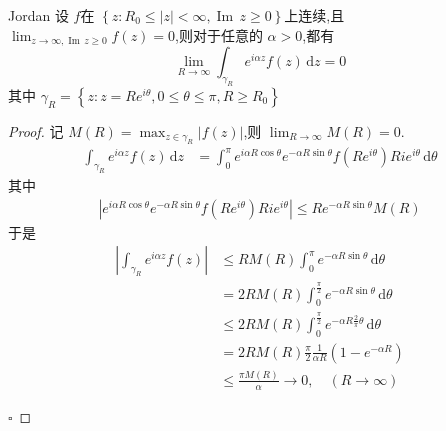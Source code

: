 \documentclass[../../复变函数.tex]{subfiles}
\begin{document}
\begin{lemma}{Jordan}
    设 \(  f  \)在 \(  \left\{ z: R_0\le \left| z \right|< \infty, \operatorname{Im}\,z\ge 0  \right\}  \)上连续,且 \(  \lim_{z\to \infty , \operatorname{Im}\,z\ge 0}f\left( z \right)= 0   \),则对于任意的 \(  \alpha > 0  \),都有 \[
    \lim_{R\to \infty}\int_{ \gamma _{R}}e^{i\alpha z}f\left( z \right)\,\mathrm{d} z= 0 
    \]    其中 \(   \gamma _{R}= \left\{ z:z= R e^{i \theta },0\le  \theta \le \pi ,R\ge R_0 \right\}  \) 
\end{lemma}
\begin{proof}
    记 \(  M\left( R \right)   = \max _{z \in \gamma _{R}}\left| f\left( z \right)  \right| \),则 \(  \lim_{R\to \infty}M\left( R \right)= 0   \). \[
    \begin{aligned}
    \int_{ \gamma _{R}}e^{i\alpha z}f\left( z \right)\,\mathrm{d} z&= \int_{0}^{\pi }e^{i\alpha R \cos  \theta }e^{-\alpha  R\sin  \theta }f\left(R e^{i \theta } \right)Ri  e^{i \theta }\,\mathrm{d}  \theta    
    \end{aligned}
    \]  其中 \[
    \begin{aligned}
\left|  e^{i\alpha R \cos  \theta }e^{-\alpha  R\sin  \theta }f\left(R e^{i \theta } \right)Ri  e^{i \theta } \right| \le R  e^{-\alpha R\sin  \theta }M\left( R \right)   
    \end{aligned}
    \]于是 \[
    \begin{aligned}
    \left| \int_{ \gamma _{R}}e^{i\alpha z}f\left( z \right)  \right|& \le RM\left( R \right)   \int_{0}^{\pi }    e^{-\alpha R\sin  \theta }\,\mathrm{d}  \theta \\ 
     &= 2RM\left( R \right) \int_{0}^{\frac{\pi}{2}}e^{-\alpha R\sin  \theta }\,\mathrm{d}  \theta \\ 
      &\le 2RM\left( R \right)  \int_{0}^{\frac{\pi  }{2 } }e^{-\alpha R \frac{2 }{\pi  } \theta  }\,\mathrm{d}  \theta \\ 
       &= 2RM\left( R \right) \frac{\pi  }{2 }\frac{1 }{\alpha R } \left( 1-e^{-\alpha R} \right)  \\ 
        &\le  \frac{\pi M\left( R \right)  }{\alpha  }\to 0 ,\quad \left( R\to \infty \right)   
    \end{aligned}
    \]

    \hfill $\square$
\end{proof}
\end{document}
